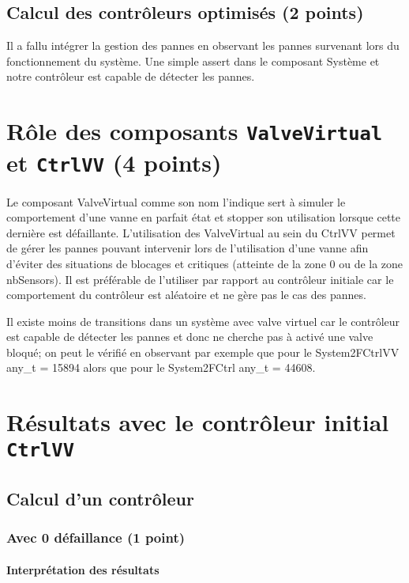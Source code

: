 \documentclass[a4paper]{book}
\begin{document}
\subsection{Calcul des contrôleurs optimisés (2 points)}
Il a fallu intégrer la gestion des pannes en observant les pannes survenant lors du fonctionnement du système. Une simple assert dans le composant Système et notre contrôleur est capable de détecter les pannes.\

\section{Rôle des composants {\tt ValveVirtual} et {\tt CtrlVV} (4 points)}
Le composant ValveVirtual comme son nom l’indique sert à simuler le comportement d’une vanne en parfait état et stopper son utilisation lorsque cette dernière est défaillante. L’utilisation des ValveVirtual au sein du CtrlVV permet de gérer les pannes pouvant intervenir lors de l’utilisation d’une vanne afin d’éviter des situations de blocages et critiques (atteinte de la zone 0 ou de la zone nbSensors). Il est préférable de l’utiliser par rapport au contrôleur initiale car le comportement du contrôleur est aléatoire et ne gère pas le cas des pannes.\

Il existe moins de transitions dans un système avec valve virtuel car le contrôleur est capable de détecter les pannes et donc ne cherche pas à activé une valve bloqué; on peut le vérifié en observant par exemple que pour le System2FCtrlVV any\_t = 15894 alors que pour le System2FCtrl any\_t = 44608.\

\section{Résultats avec le contrôleur initial {\tt CtrlVV}}
\subsection{Calcul d'un contrôleur}
\subsubsection{Avec 0 défaillance (1 point)}


%
%
%
\paragraph{Interprétation des résultats}
\end{document}

